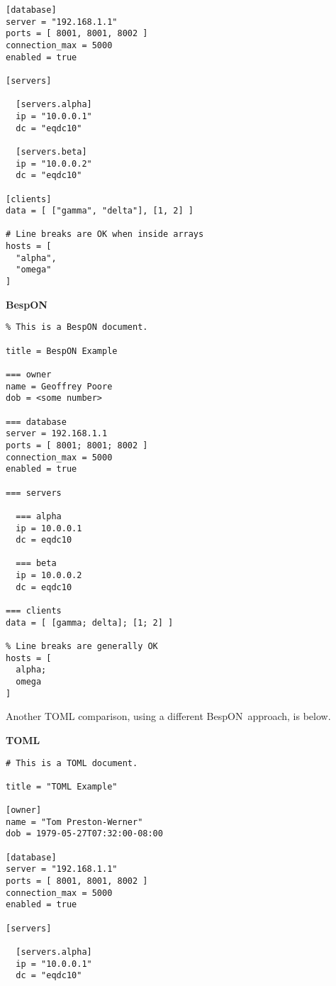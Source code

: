 \documentclass[11pt]{article}
\newcommand{\bespon}{BespON}
\begin{document}
\begin{appendices}
\begin{tcolorbox}{}
\begin{multicols}{2}
\begin{Verbatim}[formatcom=\color{DarkGreen}]
[database]
server = "192.168.1.1"
ports = [ 8001, 8001, 8002 ]
connection_max = 5000
enabled = true

[servers]

  [servers.alpha]
  ip = "10.0.0.1"
  dc = "eqdc10"

  [servers.beta]
  ip = "10.0.0.2"
  dc = "eqdc10"

[clients]
data = [ ["gamma", "delta"], [1, 2] ]

# Line breaks are OK when inside arrays
hosts = [
  "alpha",
  "omega"
]
\end{Verbatim}
\columnbreak
\centering \textbf{BespON}

\begin{Verbatim}
% This is a BespON document.

title = BespON Example

=== owner
name = Geoffrey Poore
dob = <some number>

=== database
server = 192.168.1.1
ports = [ 8001; 8001; 8002 ]
connection_max = 5000
enabled = true

=== servers

  === alpha
  ip = 10.0.0.1
  dc = eqdc10

  === beta
  ip = 10.0.0.2
  dc = eqdc10

=== clients
data = [ [gamma; delta]; [1; 2] ]

% Line breaks are generally OK
hosts = [
  alpha;
  omega
]
\end{Verbatim}
\end{multicols}
\end{tcolorbox}


Another TOML comparison, using a different \bespon\ approach, is below.

\begin{tcolorbox}{}
\begin{multicols}{2}

\centering \textbf{TOML}
\begin{Verbatim}[formatcom=\color{DarkGreen}]
# This is a TOML document.

title = "TOML Example"

[owner]
name = "Tom Preston-Werner"
dob = 1979-05-27T07:32:00-08:00

[database]
server = "192.168.1.1"
ports = [ 8001, 8001, 8002 ]
connection_max = 5000
enabled = true

[servers]

  [servers.alpha]
  ip = "10.0.0.1"
  dc = "eqdc10"


\end{Verbatim}
\end{multicols}
\end{tcolorbox}
\end{appendices}
\end{document}
